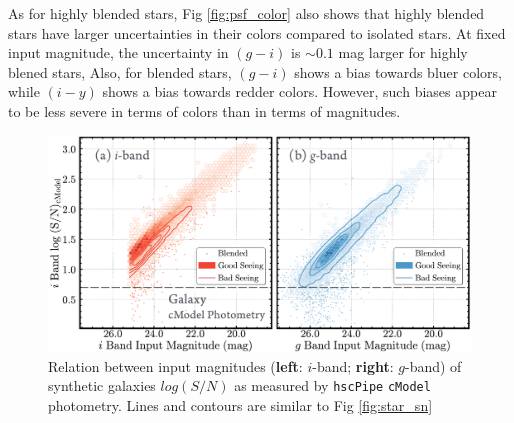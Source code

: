 \documentclass[useamsfonts]{pasj01}
\def\hscpipe{\texttt{hscPipe}}
\def\cmodel{\texttt{cModel}}
\begin{document}
    As for highly blended stars, Fig \ref{fig:psf_color} also shows that highly blended stars have larger uncertainties in their colors compared to isolated stars. At fixed input magnitude, the  uncertainty in $(g-i)$ is ${\sim}0.1$ mag larger for highly blened stars, Also, for blended stars, $(g-i)$ shows a bias towards bluer colors, while $(i-y)$ shows a bias towards redder colors. However, such biases appear to be less severe in terms of colors than in terms of magnitudes.
    

\begin{figure}
    \begin{center}
        \includegraphics[width=\textwidth]{fig/synpipe_galaxy_sn}
    \end{center}
    \caption{
        Relation between input magnitudes (\textbf{left}: $i$-band; \textbf{right}:
        $g$-band) of synthetic galaxies $log(S/N)$ as measured by \hscpipe{} \cmodel{} photometry. Lines and contours are similar to Fig \ref{fig:star_sn}
        }
    \label{fig:cmodel_sn}
\end{figure}
\end{document}
